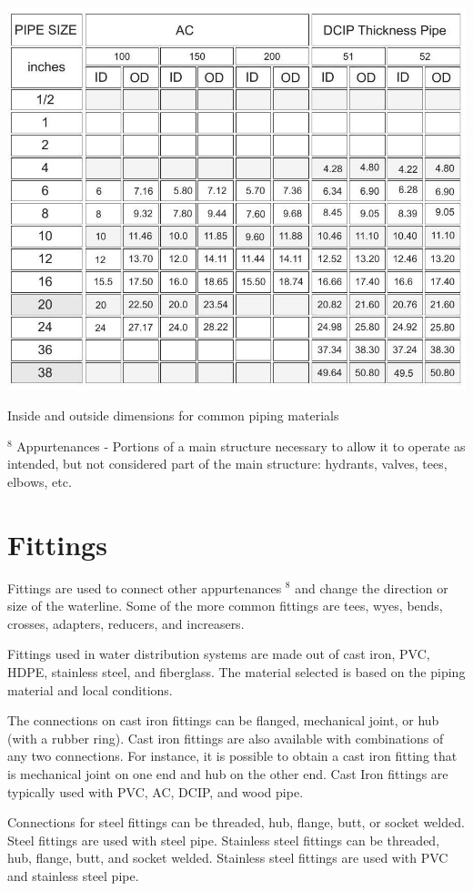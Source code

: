 \documentclass[10pt]{article}
\begin{document}
\includegraphics[max width=\textwidth]{2022_11_03_fc0cbc2f3612fab6edd2g-10(1)}

Inside and outside dimensions for common piping materials

${ }^{8}$ Appurtenances - Portions of a main structure necessary to allow it to operate as intended, but not considered part of the main structure: hydrants, valves, tees, elbows, etc.

\section{Fittings}
Fittings are used to connect other appurtenances ${ }^{8}$ and change the direction or size of the waterline. Some of the more common fittings are tees, wyes, bends, crosses, adapters, reducers, and increasers.

Fittings used in water distribution systems are made out of cast iron, PVC, HDPE, stainless steel, and fiberglass. The material selected is based on the piping material and local conditions.

The connections on cast iron fittings can be flanged, mechanical joint, or hub (with a rubber ring). Cast iron fittings are also available with combinations of any two connections. For instance, it is possible to obtain a cast iron fitting that is mechanical joint on one end and hub on the other end. Cast Iron fittings are typically used with PVC, AC, DCIP, and wood pipe.

Connections for steel fittings can be threaded, hub, flange, butt, or socket welded. Steel fittings are used with steel pipe. Stainless steel fittings can be threaded, hub, flange, butt, and socket welded. Stainless steel fittings are used with PVC and stainless steel pipe.
\end{document}
